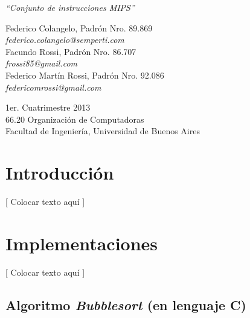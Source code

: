 \documentclass{article}
\begin{document}
\begin{titlepage}
	\vspace*{\fill}
	\begin{center}
		\Huge \textit{``Conjunto de instrucciones MIPS''} \\
		
		\bigskip\bigskip\bigskip\bigskip\bigskip

		\Large Federico Colangelo, Padrón Nro. 89.869 \\
		\large \textit{federico.colangelo@semperti.com} \\ \medskip
		\Large Facundo Rossi, Padrón Nro. 86.707 \\
		\large \textit{frossi85@gmail.com} \\ \medskip
		\Large Federico Martín Rossi, Padrón Nro. 92.086 \\
		\large \textit{federicomrossi@gmail.com} \\

		\bigskip\bigskip\bigskip\bigskip\bigskip\bigskip\bigskip

		\large 1er. Cuatrimestre 2013 \\ \smallskip
		\large 66.20 Organización de Computadoras \\ \smallskip
		\large Facultad de Ingeniería, Universidad de Buenos Aires \\ \smallskip

		\date{}
	\end{center}
	\vspace*{\fill}
\end{titlepage}
\newpage



\tableofcontents
\newpage




\section{Introducción}
	
	[ Colocar texto aquí ]
\bigskip



\section{Implementaciones}
	
	[ Colocar texto aquí ]




\subsection{Algoritmo \textit{Bubblesort} (en lenguaje C)}
\end{document}
